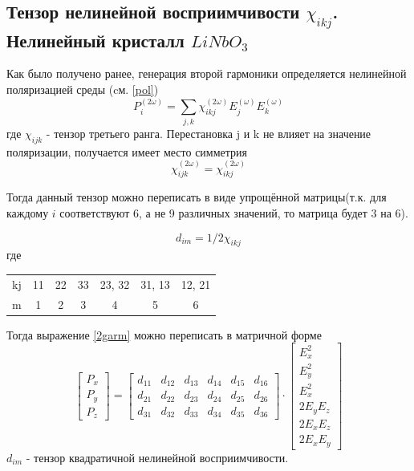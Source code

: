 \documentclass[12pt,a5paper,titlepage, main = russian]{article}
\begin{document}
\subsection*{Тензор нелинейной восприимчивости $\chi_{ikj}$. \\Нелинейный кристалл $LiNbO_3$}
Как было получено ранее, генерация второй гармоники определяется нелинейной поляризацией среды (cм. \eqref{pol})
\begin{equation}
P^{(2\omega)}_i = \sum_{j,k} \chi^{(2\omega)}_{ikj} E^{(\omega)}_j E^{(\omega)}_k
\label{2garm}
\end{equation}
где $\chi_{ijk}$ - тензор третьего ранга. Перестановка j и k не влияет на значение поляризации, получается имеет место симметрия
\begin{equation}
\chi^{(2\omega)}_{ijk} = \chi^{(2\omega)}_{ikj}
\end{equation}

Тогда данный тензор можно переписать в виде упрощённой матрицы(т.к. для каждому $i$ соответствуют 6, а не 9 различных значений, то матрица будет 3 на 6).

\begin{equation}
d_{im} = 1/2 \chi_{ikj}
\end{equation}
где
\begin{table}[H]
\begin{tabular}{c c c c c c c}
kj & 11 & 22 & 33 & 23, 32 & 31, 13 & 12, 21 \\
m & 1 & 2 & 3 & 4 & 5 & 6 \\
\end{tabular}
\end{table}

Тогда выражение \eqref{2garm} можно переписать в матричной форме
\begin{equation}
\begin{bmatrix}
P_x \\
P_y \\
P_z
\end{bmatrix}
= 
\begin{bmatrix}
d_{11} & d_{12} & d_{13} & d_{14} & d_{15} & d_{16} \\
d_{21} & d_{22} & d_{23} & d_{24} & d_{25} & d_{26} \\
d_{31} & d_{32} & d_{33} & d_{34} & d_{35} & d_{36}
\end{bmatrix}
\cdot
\begin{bmatrix}
E^2_x \\
E^2_y \\
E^2_x \\
2 E_y E_z \\
2 E_x E_z \\
2 E_x E_y
\end{bmatrix}
\label{mat}
\end{equation}
$d_{im}$ - тензор квадратичной нелинейной восприимчивости.
\end{document}
